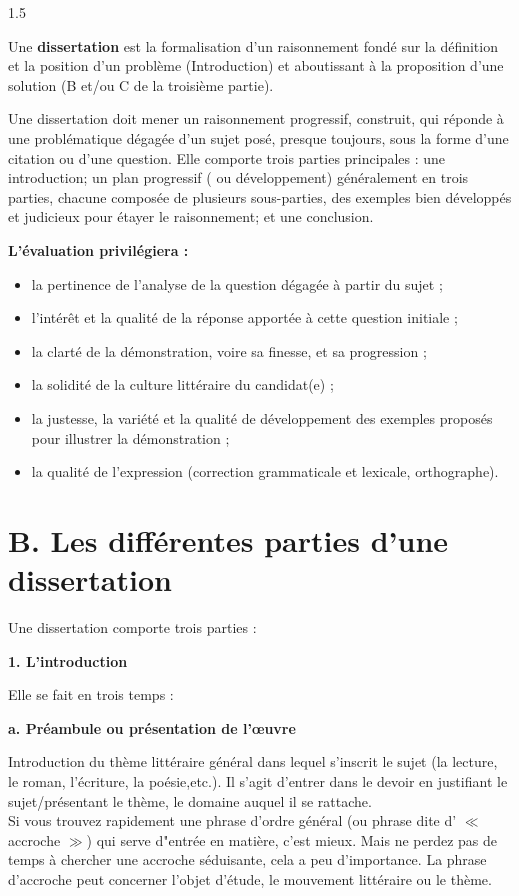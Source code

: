 \documentclass[12pt]{article}
\begin{document}
\begin{spacing}{1.5}

 Une \textbf{dissertation} est la formalisation d'un raisonnement fondé sur la définition et la position d'un problème (Introduction) et aboutissant à la proposition d'une solution (B et/ou C de la troisième partie).

 Une dissertation doit mener un raisonnement progressif, construit, qui réponde 
à une problématique dégagée d'un sujet posé, presque toujours, sous la forme d'une 
citation ou d'une question. Elle comporte trois parties principales : une introduction; un plan progressif ( ou développement) généralement en trois parties, chacune composée de plusieurs sous-parties, des exemples bien développés et judicieux pour étayer le raisonnement; et une conclusion.
 
 
 \textbf{  L'évaluation privilégiera :}
 
\begin{itemize}
 \item la pertinence de l'analyse de la question dégagée à partir du sujet ;
 \item l'intérêt et la qualité de la réponse apportée à cette question initiale ;
\item la clarté de la démonstration, voire sa finesse, et sa progression ;
 \item la solidité de la culture littéraire du candidat(e) ;
 \item la justesse, la variété et la qualité de développement des exemples proposés pour illustrer la démonstration ;
 \item la qualité de l'expression (correction grammaticale et lexicale, orthographe).
\end{itemize}

\section*{B. Les différentes parties d'une dissertation}

Une dissertation comporte trois parties :

\quad
\textbf{ 1. L'introduction}

 Elle se fait en trois temps :

\quad

\textbf{a. Préambule ou présentation de l'œuvre}


Introduction du thème littéraire général dans lequel s'inscrit le sujet (la lecture, le roman, l'écriture, la poésie,etc.). Il s'agit d'entrer dans le devoir en justifiant le sujet/présentant le thème, le domaine auquel il se rattache.\\
Si vous trouvez rapidement une phrase d'ordre général (ou phrase dite d' $\ll$ accroche $\gg$) qui serve d"entrée en matière, c'est mieux. Mais ne perdez pas de temps à chercher une 
accroche séduisante, cela a peu d'importance. La phrase d'accroche peut concerner l'objet d'étude, le mouvement littéraire ou le thème.


\end{spacing}
\end{document}
